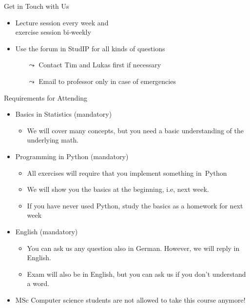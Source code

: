 \documentclass[aspectratio=169,handout]{../latex_main/tntbeamer}  %
\begin{document}
\begin{frame}[c]{Get in Touch with Us}

\begin{itemize}
  \item Lecture session every week and\\ exercise session bi-weekly
  \item \alert{Use the forum in StudIP for all kinds of questions}
  \begin{itemize}
        \item[$\leadsto$] Contact Tim and Lukas first if necessary 
      \item[$\leadsto$] Email to professor only in case of emergencies
  \end{itemize}
\end{itemize}

\end{frame}
\begin{frame}[c]{Requirements for Attending}

\begin{itemize}
    \item Basics in \alert{Statistics} (mandatory)
    \begin{itemize}
        \item We will cover many concepts, but you need a basic understanding of the underlying math.
    \end{itemize}
  \item Programming in \alert{Python} (mandatory)
  \begin{itemize}
    \item All exercises will require that you implement something in~Python 
    \item We will show you the basics at the beginning, i.e, next week.
    \item If you have never used Python, study the basics as a homework for next week
  \end{itemize}
  \item \alert{English} (mandatory)
    \begin{itemize}
    \item You can ask us any question also in German. However, we will reply in English.
    \item Exam will also be in English, but you can ask us if you don't understand a word.
  \end{itemize}
    \pause
    \break
  \item \alert{MSc Computer science students are not allowed to take this course anymore!}
\end{itemize}

\end{frame}
\end{document}
